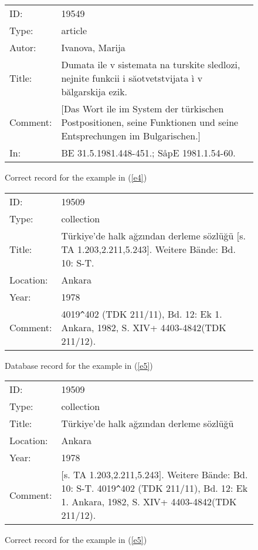\documentclass{scrartcl}
\begin{document}
\begin{figure}[ht]
\begin{tabular}{|p{}p{}|}
ID:  	&19549 \\
Type: 	&article \\
Autor: 	&Ivanova, Marija \\
Title: 	&Dumata ile v sistemata na turskite sledlozi, nejnite funkcii i
săotvetstvijata ì v bălgarskija ezik.  \\
Comment:& 	$[$Das Wort ile im System der türkischen Postpositionen, seine
Funktionen und seine Entsprechungen im Bulgarischen.$]$ \\
In:		& BE 31.5.1981.448-451.; SåpE 1981.1.54-60.
\end{tabular}
\caption{Correct record for the example in (\ref{e4}) \label{e4:f2}}
\end{figure}

\begin{figure}[ht]
\begin{tabular}{|p{}p{}|}
ID:  	&19509 \\
Type: 	&collection \\
Title: 	&Türkiye'de halk ağzından derleme sözlüğü $[$s. TA 1.203,2.211,5.243$]$.
Weitere Bände: Bd. 10: S-T. \\
Location: &	Ankara \\
Year: 	&1978 \\
Comment:& 	4019\verb+^+402 (TDK 211/11), Bd. 12: Ek 1. Ankara, 1982, S. XIV+
4403-4842(TDK 211/12).
\end{tabular}
\caption{Database record for the example in (\ref{e5}) \label{e5:f1}}
\end{figure} 

\begin{figure}[ht]
\begin{tabular}{|p{}p{}|}
ID:  	&19509 \\
Type: 	&collection \\
Title: 	&Türkiye'de halk ağzından derleme sözlüğü  \\
Location: &	Ankara \\
Year: 	&1978 \\
Comment:& 	$[$s. TA 1.203,2.211,5.243$]$.
Weitere Bände: Bd. 10: S-T. 4019\verb+^+402 (TDK 211/11), Bd. 12: Ek 1. Ankara,
1982, S. XIV+ 4403-4842(TDK 211/12).
\end{tabular}
\caption{Correct record for the example in (\ref{e5}) \label{e5:f2}}
\end{figure}
\end{document}

